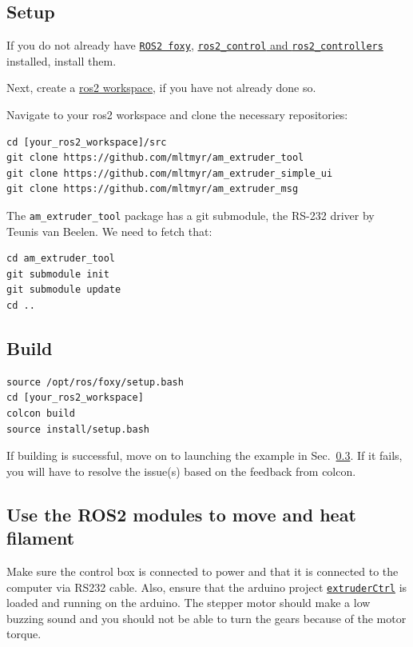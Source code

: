 \documentclass[10pt]{article}
\begin{document}
\subsection{Setup}
If you do not already have \href{https://docs.ros.org/en/foxy/Installation}{\texttt{ROS2 foxy}}, \href{https://control.ros.org/getting_started}{\texttt{ros2\_control} and \texttt{ros2\_controllers}}  installed, install them.

Next, create a \href{https://docs.ros.org/en/foxy/Tutorials/Workspace/Creating-A-Workspace.html}{ros2 workspace}, if you have not already done so. 

Navigate to your ros2 workspace and clone the necessary repositories:
\begin{lstlisting}
cd [your_ros2_workspace]/src
git clone https://github.com/mltmyr/am_extruder_tool
git clone https://github.com/mltmyr/am_extruder_simple_ui
git clone https://github.com/mltmyr/am_extruder_msg
\end{lstlisting}

The \texttt{am\_extruder\_tool} package has a git submodule, the RS-232 driver by Teunis van Beelen. We need to fetch that:

\begin{lstlisting}
cd am_extruder_tool
git submodule init
git submodule update
cd ..
\end{lstlisting}

\subsection{Build}

\begin{lstlisting}
source /opt/ros/foxy/setup.bash
cd [your_ros2_workspace]
colcon build
source install/setup.bash
\end{lstlisting}

If building is successful, move on to launching the example in Sec.~\ref{sec:launch_example}. If it fails, you will have to resolve the issue(s) based on the feedback from colcon.

\subsection{Use the ROS2 modules to move and heat filament}\label{sec:launch_example}
Make sure the control box is connected to power and that it is connected to the computer via RS232 cable. Also, ensure that the arduino project \href{https://github.com/mltmyr/extruderCtrl}{\texttt{extruderCtrl}} is loaded and running on the arduino. The stepper motor should make a low buzzing sound and you should not be able to turn the gears because of the motor torque.
\end{document}
